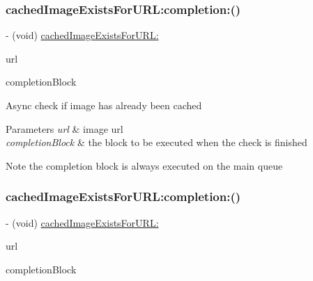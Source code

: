 \subsubsection{\texorpdfstring{cached\+Image\+Exists\+For\+U\+R\+L\+:completion\+:()}{cachedImageExistsForURL:completion:()}\hspace{0.1cm}{\footnotesize\ttfamily [2/3]}}
{\footnotesize\ttfamily -\/ (void) \mbox{\hyperlink{interface_s_d_web_image_manager_a9634c36e65314e0b973056a96f6a62e2}{cached\+Image\+Exists\+For\+U\+R\+L\+:}} \begin{DoxyParamCaption}\item[{(N\+S\+U\+RL $\ast$)}]{url }\item[{completion:(S\+D\+Web\+Image\+Check\+Cache\+Completion\+Block)}]{completion\+Block }\end{DoxyParamCaption}}

Async check if image has already been cached


\begin{DoxyParams}{Parameters}
{\em url} & image url \\
\hline
{\em completion\+Block} & the block to be executed when the check is finished\\
\hline
\end{DoxyParams}
\begin{DoxyNote}{Note}
the completion block is always executed on the main queue 
\end{DoxyNote}
\mbox{\label{interface_s_d_web_image_manager_a5583bb0fba17b92ce2fe9245b6ecafd2}} 
\subsubsection{\texorpdfstring{cached\+Image\+Exists\+For\+U\+R\+L\+:completion\+:()}{cachedImageExistsForURL:completion:()}\hspace{0.1cm}{\footnotesize\ttfamily [3/3]}}
{\footnotesize\ttfamily -\/ (void) \mbox{\hyperlink{interface_s_d_web_image_manager_a9634c36e65314e0b973056a96f6a62e2}{cached\+Image\+Exists\+For\+U\+R\+L\+:}} \begin{DoxyParamCaption}\item[{(N\+S\+U\+RL $\ast$)}]{url }\item[{completion:(S\+D\+Web\+Image\+Check\+Cache\+Completion\+Block)}]{completion\+Block }\end{DoxyParamCaption}}

